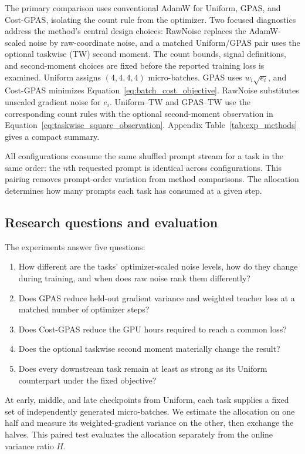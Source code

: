 The primary comparison uses conventional AdamW for Uniform, GPAS, and
Cost-GPAS, isolating the count rule from the optimizer. Two focused diagnostics
address the method's central design choices: RawNoise replaces the
AdamW-scaled noise by raw-coordinate noise, and a matched Uniform/GPAS pair uses
the optional taskwise (TW) second moment. The count bounds, signal definitions,
and second-moment choices are fixed before the reported training loss is
examined. Uniform assigns $(4,4,4,4)$ micro-batches. GPAS uses
$w_i\sqrt{e_i}$, and Cost-GPAS minimizes
Equation~\ref{eq:batch_cost_objective}. RawNoise substitutes unscaled gradient
noise for $e_i$. Uniform--TW and GPAS--TW use the corresponding count rules
with the optional second-moment observation in
Equation~\ref{eq:taskwise_square_observation}. Appendix
Table~\ref{tab:exp_methods} gives a compact summary.

All configurations consume the same shuffled prompt stream for a task in the
same order: the $n$th requested prompt is identical across configurations.
This pairing removes prompt-order variation from method comparisons. The
allocation determines how many prompts each task has consumed at a given step.

\subsection{Research questions and evaluation}

The experiments answer five questions:
\begin{enumerate}
    \item How different are the tasks' optimizer-scaled noise levels, how do
    they change during training, and when does raw noise rank them differently?
    \item Does GPAS reduce held-out gradient variance and weighted teacher loss
    at a matched number of optimizer steps?
    \item Does Cost-GPAS reduce the GPU hours required to reach a common loss?
    \item Does the optional taskwise second moment materially change the result?
    \item Does every downstream task remain at least as strong as its Uniform
    counterpart under the fixed objective?
\end{enumerate}

At early, middle, and late checkpoints from Uniform, each task supplies a
fixed set of independently generated micro-batches. We estimate the allocation
on one half and measure its weighted-gradient variance on the other, then
exchange the halves. This paired test evaluates the allocation separately from
the online variance ratio $H$.

